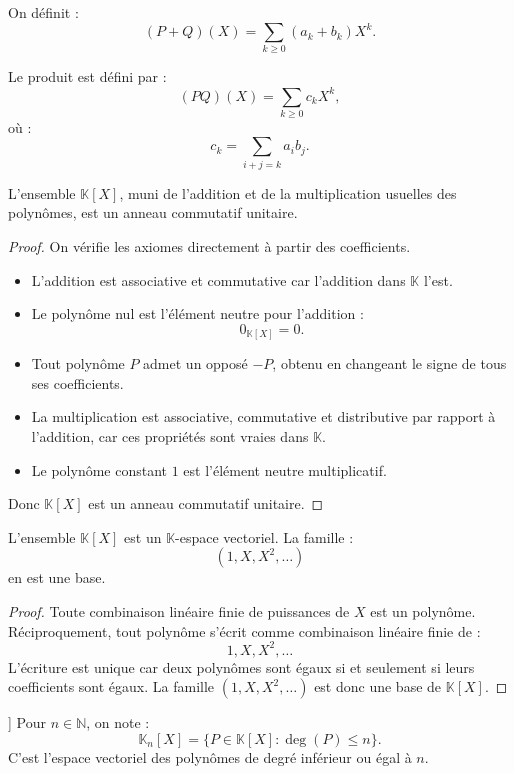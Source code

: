 \documentclass[11pt,a4paper]{article}
\newcommand{\K}{\mathbb K}
\newcommand{\N}{\mathbb N}
\begin{document}
On définit :
\[
(P+Q)(X)=\sum_{k\geq0}(a_k+b_k)X^k.
\]

Le produit est défini par :
\[
(PQ)(X)=\sum_{k\geq0} c_kX^k,
\]
où :
\[
c_k=\sum_{i+j=k}a_ib_j.
\]

\begin{theorembox}
L'ensemble \(\K[X]\), muni de l'addition et de la multiplication usuelles des polynômes, est un anneau commutatif unitaire.
\end{theorembox}

\begin{proof}
On vérifie les axiomes directement à partir des coefficients.

\begin{itemize}
    \item L'addition est associative et commutative car l'addition dans \(\K\) l'est.
    \item Le polynôme nul est l'élément neutre pour l'addition :
    \[
    0_{\K[X]}=0.
    \]
    \item Tout polynôme \(P\) admet un opposé \(-P\), obtenu en changeant le signe de tous ses coefficients.
    \item La multiplication est associative, commutative et distributive par rapport à l'addition, car ces propriétés sont vraies dans \(\K\).
    \item Le polynôme constant \(1\) est l'élément neutre multiplicatif.
\end{itemize}

Donc \(\K[X]\) est un anneau commutatif unitaire.
\end{proof}

\begin{theorembox}
L'ensemble \(\K[X]\) est un \(\K\)-espace vectoriel.  
La famille :
\[
(1,X,X^2,\dots)
\]
en est une base.
\end{theorembox}

\begin{proof}
Toute combinaison linéaire finie de puissances de \(X\) est un polynôme.  
Réciproquement, tout polynôme s'écrit comme combinaison linéaire finie de :
\[
1,X,X^2,\dots
\]
L'écriture est unique car deux polynômes sont égaux si et seulement si leurs coefficients sont égaux.  
La famille \((1,X,X^2,\dots)\) est donc une base de \(\K[X]\).
\end{proof}

\begin{definitionbox}[Espace \(\K_n[X]\)]
Pour \(n\in\N\), on note :
\[
\K_n[X]=\{P\in\K[X]:\deg(P)\leq n\}.
\]
C'est l'espace vectoriel des polynômes de degré inférieur ou égal à \(n\).
\end{definitionbox}
\end{document}
